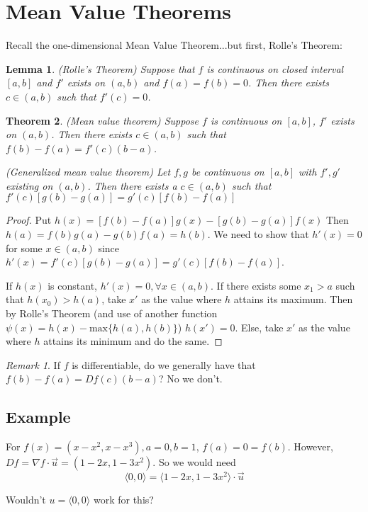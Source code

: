 \documentclass[12pt]{article}
\newtheorem{theorem}{Theorem}[section]
\newtheorem{lemma}[theorem]{Lemma}
\theoremstyle{definition}
\theoremstyle{remark}
\newtheorem*{remark}{Remark}
\newenvironment{question}[2][QUESTION]{\begin{trivlist}
\item[\hskip \labelsep {\bfseries #1}\hskip \labelsep {\bfseries #2.}]}{\end{trivlist}}
\begin{document}
\section{Mean Value Theorems}
Recall the one-dimensional Mean Value Theorem...but first, Rolle's Theorem:
\begin{lemma}
   (Rolle's Theorem) Suppose that $f$ is continuous on closed interval $[a,b]$ and $f'$ exists on $(a,b)$ and $f(a)=f(b)=0$.
   Then there exists $c\in(a,b)$ such that $f'(c)=0$.
\end{lemma}
\begin{theorem}\label{mvt}
    (Mean value theorem) Suppose $f$ is continuous on $[a,b]$, $f'$ exists on $(a,b)$.
    Then there exists $c\in (a,b)$ such that $f(b)-f(a)=f'(c)(b-a)$.
    
    (Generalized mean value theorem) Let $f,g$ be continuous on $[a,b]$ with $f',g'$ existing on $(a,b)$.
    Then there exists a $c\in (a,b)$ such that $f'(c)[g(b)-g(a)]=g'(c)[f(b)-f(a)]$
\end{theorem}
\begin{proof}
    Put $h(x)=[f(b)-f(a)]g(x)-[g(b)-g(a)]f(x)$
    Then $h(a)=f(b)g(a)-g(b)f(a)=h(b)$.
    We need to show that $h'(x)=0$ for some $x\in(a,b)$ since $h'(x)=f'(c)[g(b)-g(a)]=g'(c)[f(b)-f(a)]$.

    If $h(x)$ is constant, $h'(x)=0, \forall x\in(a,b)$. If there exists some $x_1>a$ such that $h(x_0)>h(a)$, take $x'$ as the value where $h$ attains its maximum. Then by Rolle's Theorem (and use of another function $\psi(x)=h(x)-\text{max}\{h(a),h(b)\}$) $h(x')=0$. Else, take $x'$ as the value where $h$ attains its minimum and do the same.
\end{proof}
\begin{remark}
   If $f$ is differentiable, do we generally have that $f(b)-f(a)=Df(c)(b-a)$? No we don't. 
\end{remark}
\subsection{Example}
For $f(x)=(x-x^2,x-x^3), a=0, b=1$, $f(a)=0=f(b)$. However, $Df=\nabla f\cdot\vec{u}=(1-2x,1-3x^2)$. So we would need
$$\langle0,0\rangle = \langle1-2x,1-3x^2\rangle\cdot \vec{u}$$
\begin{question}{7.1}
   Wouldn't $u=\langle0,0\rangle$ work for this? 
\end{question}
\end{document}
